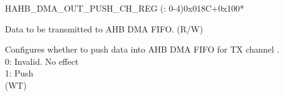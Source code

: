 \begin{register}{H}{AHB\_DMA\_OUT\_PUSH\_CH\_REG (: 0-4)}{0x018C+0x100*}\label{regdesc:AHBDMAOUTPUSHCHNREG}
%
%
%
\regnewline%
\begin{regdesc}\begin{reglist}
\label{fielddesc:AHBDMAOUTFIFOWDATACHN}\item [AHB\_DMA\_OUTFIFO\_WDATA\_CH\regindex{n}] Data to be transmitted to AHB DMA FIFO. (R/W)
\label{fielddesc:AHBDMAOUTFIFOPUSHCHN}\item [AHB\_DMA\_OUTFIFO\_PUSH\_CH\regindex{n}] Configures whether to push data into AHB DMA FIFO for TX channel .\\0: Invalid. No effect\\1: Push\\ (WT)
\end{reglist}\end{regdesc}
\end{register}


